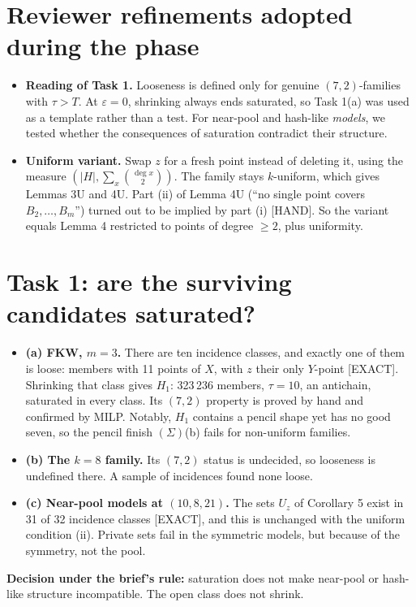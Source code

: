 \documentclass[11pt]{article}
\newcommand{\lvl}[1]{\textsf{\small[#1]}}
\begin{document}
\section*{Reviewer refinements adopted during the phase}
\begin{itemize}
\item \textbf{Reading of Task 1.} Looseness is defined only for genuine $(7,2)$-families with $\tau>T$. At
$\varepsilon=0$, shrinking always ends saturated, so Task 1(a) was used as a template rather than a test. For near-pool
and hash-like \emph{models}, we tested whether the consequences of saturation contradict their structure.
\item \textbf{Uniform variant.} Swap $z$ for a fresh point instead of deleting it, using the measure
$(|H|,\sum_x\binom{\deg x}{2})$. The family stays $k$-uniform, which gives Lemmas 3U and 4U. Part (ii) of Lemma 4U
(``no single point covers $B_2,\dots,B_m$'') turned out to be implied by part (i) \lvl{HAND}. So the variant equals
Lemma 4 restricted to points of degree $\ge2$, plus uniformity.
\end{itemize}

\section*{Task 1: are the surviving candidates saturated?}
\begin{itemize}
\item \textbf{(a) FKW, $m=3$.} There are ten incidence classes, and exactly one of them is loose: members with 11 points
of $X$, with $z$ their only $Y$-point \lvl{EXACT}. Shrinking that class gives $H_1$: 323\,236 members, $\tau=10$, an
antichain, saturated in every class. Its $(7,2)$ property is proved by hand and confirmed by MILP. Notably, $H_1$
contains a pencil shape yet has no good seven, so the pencil finish $(\Sigma)$(b) fails for non-uniform families.
\item \textbf{(b) The $k=8$ family.} Its $(7,2)$ status is undecided, so looseness is undefined there. A sample of
incidences found none loose.
\item \textbf{(c) Near-pool models at $(10,8,21)$.} The sets $U_z$ of Corollary 5 exist in 31 of 32 incidence classes
\lvl{EXACT}, and this is unchanged with the uniform condition (ii). Private sets fail in the symmetric models, but
because of the symmetry, not the pool.
\end{itemize}
\textbf{Decision under the brief's rule:} saturation does not make near-pool or hash-like structure incompatible. The
open class does not shrink.
\end{document}
